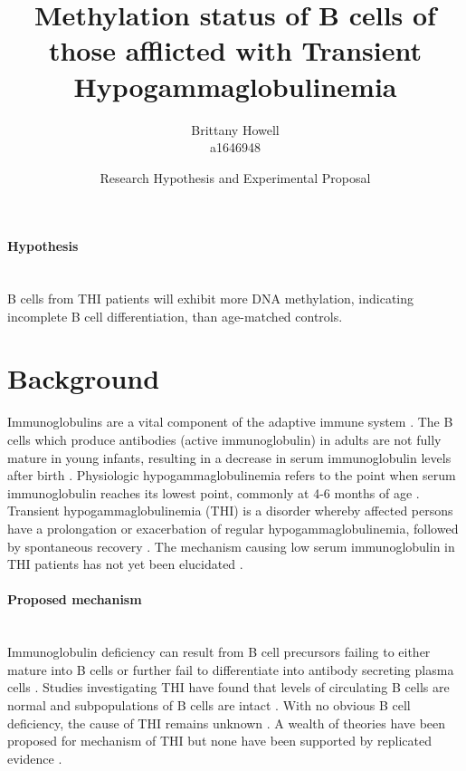 \documentclass[12pt]{article}
\title{Methylation status of B cells of those afflicted with Transient Hypogammaglobulinemia}
\date{Research Hypothesis and Experimental Proposal}
\author{Brittany Howell \\ a1646948}
\begin{document}
	\maketitle
	
	\paragraph{Hypothesis}
	~\\
	B cells from THI patients will exhibit more DNA methylation, indicating incomplete B cell differentiation, than age-matched controls.
	
	\section{Background}
	
		Immunoglobulins are a vital component of the adaptive immune system \citep{Simon15}.  
		The B cells which produce antibodies (active immunoglobulin) in adults are not fully mature in young infants, resulting in a decrease in serum immunoglobulin levels after birth \citep{Martin10,Rechavi15,Stiemh80}. 
		Physiologic hypogammaglobulinemia refers to the point when serum immunoglobulin reaches its lowest point, commonly at 4-6 months of age \citep{Dressler89}. 
		Transient hypogammaglobulinemia (THI) is a disorder whereby affected persons have a prolongation or exacerbation of regular hypogammaglobulinemia, followed by spontaneous recovery \citep{Stiemh80,Dressler89,AlHerz14,Gitlin56,AlHerz11,Rosen66,McGeady87, Dalal98,Tiller78,Buckley83}.
		The mechanism causing low serum immunoglobulin in THI patients has not yet been elucidated \citep{AlHerz14}. 

	
		\paragraph{Proposed mechanism} 
			~\\
			Immunoglobulin deficiency can result from B cell precursors failing to either mature into B cells or further fail to differentiate into antibody secreting plasma cells \citep{Fiorilli86}. 
			Studies investigating THI have found that levels of circulating B cells are normal and subpopulations of B cells are intact \citep{Tiller78,Stiemh80,Siegel81,Buckley83,Fiorilli86,Dressler89}.
			With no obvious B cell deficiency, the cause of THI remains unknown \citep{AlHerz14}. 
			A wealth of theories have been proposed for mechanism of THI but none have been supported by replicated evidence \citep{Fudenberg64,Rosen66,Nathenson71,Willenbockel60,Soothill68,Tiller78,Fiorilli86,Ovadia14,Siegel81,McGeady87}.
			
\end{document}
